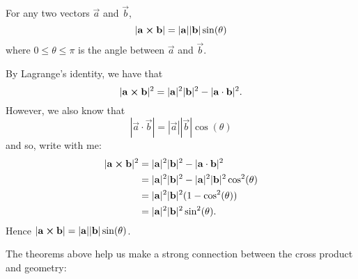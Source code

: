 \documentclass{ximera}
\begin{document}
\begin{theorem}
  For any two vectors $\vec{a}$ and $\vec{b}$,
  \[
  |\mathbf{a} \boldsymbol\times \mathbf{b}| = |\mathbf{a}||\mathbf{b}|\sin(\theta)
  \]
  where $0\le \theta\le\pi$ is the angle between $\vec{a}$ and
  $\vec{b}$.
  \begin{explanation}
    By Lagrange's identity, we have that
    \[
    |\mathbf{a}\boldsymbol\times\mathbf{b}|^2 = |\mathbf{a}|^2 |\mathbf{b}|^2 - |\mathbf{a}\cdot\mathbf{b}|^2.
    \]
    However, we also know that
    \[
    |\vec{a} \cdot\vec{b}| = |\vec{a}| |\vec{b}|\cos(\theta)
    \]
    and so, write with me:
    \begin{align*}
      |\mathbf{a}\boldsymbol\times\mathbf{b}|^2 &= |\mathbf{a}|^2 |\mathbf{b}|^2 - |\mathbf{a}\cdot\mathbf{b}|^2\\
      &= |\mathbf{a}|^2 |\mathbf{b}|^2 - |\mathbf{a}|^2 |\mathbf{b}|^2\cos^2(\theta)\\
      &= |\mathbf{a}|^2 |\mathbf{b}|^2(1 - \cos^2(\theta))\\
      &= |\mathbf{a}|^2 |\mathbf{b}|^2\sin^2(\theta).
    \end{align*}
    Hence $|\mathbf{a} \boldsymbol\times \mathbf{b}| = |\mathbf{a}||\mathbf{b}|\sin(\theta)$.
  \end{explanation}
\end{theorem}

The theorems above help us make a strong connection between the cross
product and geometry:
\end{document}
